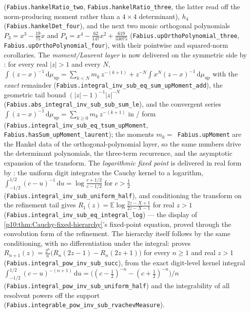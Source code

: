 \documentclass[11pt,oneside]{article}
\theoremstyle{definition}
\theoremstyle{remark}
\newcommand{\Up}{\operatorname{up}}
\newcommand{\E}{\mathbb E}
\newcommand{\dd}{\,\mathrm d}
\newcommand{\1}{\mathbf 1}
\begin{document}
\begin{statusbox}
(\nolinkurl{Fabius.hankelRatio\_two}, \nolinkurl{Fabius.hankelRatio\_three}, the latter read off the
norm-producing moment rather than a \(4\times4\) determinant), \(h_4\)
(\nolinkurl{Fabius.hankelDet\_four}), and the next two monic orthogonal polynomials
\(P_3=x^3-\tfrac{19}{75}x\) and \(P_4=x^4-\tfrac{62}{147}x^2+\tfrac{619}{33075}\)
(\nolinkurl{Fabius.upOrthoPolynomial\_three}, \nolinkurl{Fabius.upOrthoPolynomial\_four}),
with their pointwise and squared-norm corollaries.  The \emph{moment/Laurent layer} is
now delivered on the symmetric side by
: for every real \(|z|>1\) and every \(N\),
\(\int(z-x)^{-1}\dd\mu_{\Up}=\sum_{k<N}m_k\,z^{-(k+1)}+z^{-N}\int x^N(z-x)^{-1}\dd\mu_{\Up}\)
with the \emph{exact} remainder (\nolinkurl{Fabius.integral\_inv\_sub\_eq\_sum\_upMoment\_add}),
the geometric tail bound \((|z|-1)^{-1}|z|^{-N}\)
(\nolinkurl{Fabius.abs\_integral\_inv\_sub\_sub\_sum\_le}), and the convergent series
\(\int(z-x)^{-1}\dd\mu_{\Up}=\sum_{k\ge0}m_k\,z^{-(k+1)}\) in / form
(\nolinkurl{Fabius.integral\_inv\_sub\_eq\_tsum\_upMoment}, \nolinkurl{Fabius.hasSum\_upMoment\_laurent});
the moments \(m_k=\)~\nolinkurl{Fabius.upMoment} are the Hankel data of the orthogonal-polynomial
layer, so the same numbers drive the determinant polynomials, the three-term recurrence,
and the asymptotic expansion of the transform.  The \emph{logarithmic fixed point} is
delivered in real form by : the uniform digit
integrates the Cauchy kernel to a logarithm,
\(\int_{-1/2}^{1/2}(c-u)^{-1}\dd u=\log\frac{c+1/2}{c-1/2}\) for \(c>\tfrac12\)
(\nolinkurl{Fabius.integral\_inv\_sub\_uniform\_half}), and conditioning the transform on
the refinement tail gives \(R_1(z)=\E\log\frac{2z-X+1}{2z-X-1}\) for real \(z>1\)
(\nolinkurl{Fabius.integral\_inv\_sub\_eq\_integral\_log}) --- the display of
\cref{p10:thm:Cauchy-fixed-hierarchy}'s fixed-point equation, proved through the
convolution form of the refinement.  The hierarchy itself follows by the same
conditioning, with no differentiation under the integral:
 proves
\(R_{n+1}(z)=\tfrac{2^n}{n}\bigl(R_n(2z-1)-R_n(2z+1)\bigr)\) for every \(n\ge1\) and real
\(z>1\) (\nolinkurl{Fabius.integral\_pow\_inv\_sub\_succ}), from the exact digit-level kernel
integral \(\int_{-1/2}^{1/2}(c-u)^{-(n+1)}\dd u=\bigl((c-\tfrac12)^{-n}-(c+\tfrac12)^{-n}\bigr)/n\)
(\nolinkurl{Fabius.integral\_pow\_inv\_sub\_uniform\_half}) and the integrability of all
resolvent powers off the support (\nolinkurl{Fabius.integrable\_pow\_inv\_sub\_rvachevMeasure}).

\end{statusbox}
\end{document}

